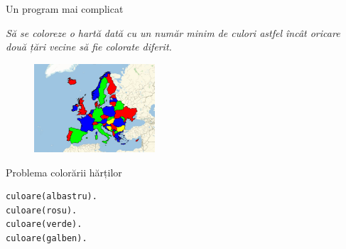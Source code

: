 \documentclass[xcolor=x11names,compress,10pt]{beamer}
\begin{document}
\begin{frame}[fragile]{Un program mai complicat}
\vspace*{0.5cm}

\smallskip

{\em Să se coloreze o hartă dată cu un număr minim de culori astfel încât oricare două țări vecine să fie colorate diferit.}  

\medskip
 
\begin{example}
\begin{multicols}{2}
\columnbreak
\begin{figure}[h]
    \includegraphics[width=0.4\textwidth]{img/europe1}
    
    \href{https://www.wolfram.com/mathematica/new-in-10/entity-based-geocomputation/find-the-shortest-route-through-the-worlds-capital.html}{\footnotesize{}}
\end{figure}
\end{multicols}
\end{example}

\end{frame}


\addtocounter{framenumber}{-1}
\begin{frame}[fragile]{Problema colorării hărților}


\begin{example}
\vspace{-.3cm}
\begin{verbatim}
culoare(albastru).
culoare(rosu).
culoare(verde).
culoare(galben).

\end{verbatim}



\vspace{2.8cm}
\end{example}


\end{frame}
\end{document}
